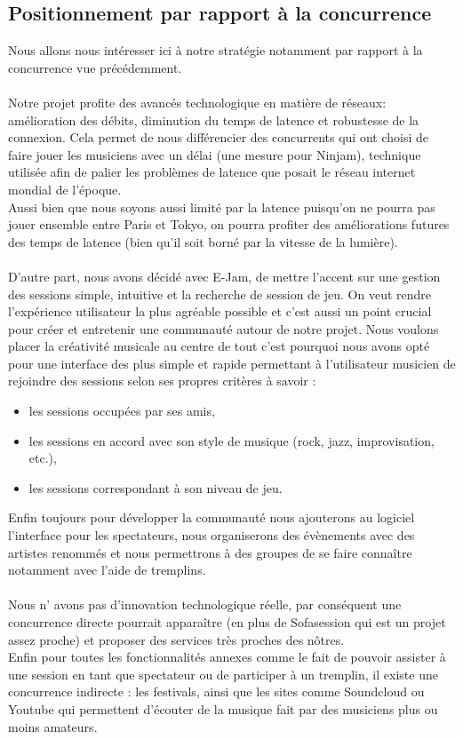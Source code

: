 \documentclass[a4,12pt]{article}
\begin{document}
\subsection{Positionnement par rapport à la concurrence}
Nous allons nous intéresser ici à notre stratégie notamment par rapport à la concurrence vue précédemment.\\
\\
Notre projet profite des avancés technologique en matière de réseaux: amélioration des débits, diminution du temps de latence et robustesse de la connexion. Cela permet de nous différencier des concurrents qui ont choisi de faire jouer les musiciens avec un délai (une mesure pour Ninjam), technique utilisée afin de palier les problèmes de latence que posait le réseau internet mondial de l’époque.\\
Aussi bien que nous soyons aussi limité par la latence puisqu’on ne pourra pas jouer ensemble entre Paris et Tokyo, on pourra profiter des améliorations futures des temps de latence (bien qu'il soit borné par la vitesse de la lumière).\\
\\
D'autre part, nous avons décidé avec E-Jam, de mettre l'accent sur une gestion des sessions simple, intuitive et la recherche de session de jeu. On veut rendre l'expérience utilisateur la plus agréable possible et c’est aussi un point crucial pour créer et entretenir une communauté autour de notre projet. Nous voulons placer la créativité musicale au centre de tout c’est pourquoi nous avons opté pour une interface des plus simple et rapide permettant à l’utilisateur musicien de rejoindre des sessions selon ses propres critères à savoir :
\begin{itemize}
    \item les sessions occupées par ses amis,
    \item les sessions en accord avec son style de musique (rock, jazz, improvisation, etc.),
    \item les sessions correspondant à son niveau de jeu.
\end{itemize}
Enfin toujours pour développer la communauté nous ajouterons au logiciel l'interface pour les spectateurs, nous organiserons des évènements avec des artistes renommés et nous permettrons à des groupes de se faire connaître notamment avec l’aide de tremplins.\\
\\
Nous n’ avons pas d'innovation technologique réelle, par conséquent une concurrence directe pourrait apparaître (en plus de Sofasession qui est un projet assez proche) et proposer des services très proches des nôtres.\\
Enfin pour toutes les fonctionnalités annexes comme le fait de pouvoir assister à une session en tant que spectateur ou de participer à un tremplin, il existe une concurrence indirecte : les festivals, ainsi que les sites comme Soundcloud ou Youtube qui permettent d'écouter de la musique fait par des musiciens plus ou moins amateurs.
\end{document}
